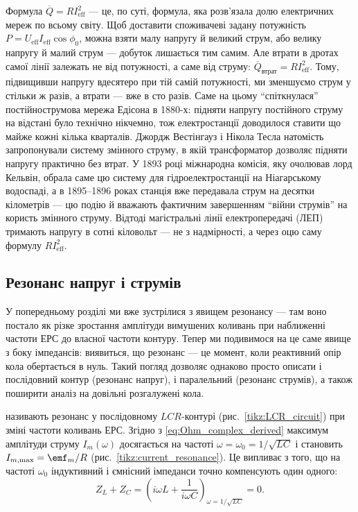 \begin{Historical}
	Формула $\overline{Q} = RI_{\text{eff}}^2$ --- це, по суті, формула, яка розв'язала долю електричних мереж по всьому світу. Щоб доставити споживачеві задану потужність $P = U_{\text{eff}}I_{\text{eff}}\cos\phi_0$, можна взяти малу напругу й великий струм, або велику напругу й малий струм --- добуток лишається тим самим. Але втрати в дротах самої лінії залежать не від потужності, а саме від струму: $\overline{Q}_{\text{втрат}} = RI_{\text{eff}}^2$. Тому, підвищивши напругу вдесятеро при тій самій потужності, ми зменшуємо струм у стільки ж разів, а втрати --- вже в сто разів. Саме на цьому \enquote{спіткнулася} постійнострумова мережа Едісона в 1880-х: підняти напругу постійного струму на відстані було технічно нікчемно, тож електростанції доводилося ставити що майже кожні кілька кварталів. Джордж Вестінгауз і Нікола Тесла натомість запропонували систему змінного струму, в якій трансформатор дозволяє підняти напругу практично без втрат. У 1893 році міжнародна комісія, яку очолював лорд Кельвін, обрала саме цю систему для гідроелектростанції на Ніагарському водоспаді, а в 1895--1896 роках станція вже передавала струм на десятки кілометрів --- цю подію й вважають фактичним завершенням \enquote{війни струмів} на користь змінного струму. Відтоді магістральні лінії електропередачі (ЛЕП) тримають напругу в сотні кіловольт --- не з надмірності, а через оцю саму формулу $RI_{\text{eff}}^2$.
\end{Historical}

\subsection*{Резонанс напруг і струмів}\label{sec:ac_resonance}

У попередньому розділі ми вже зустрілися з явищем резонансу --- там воно постало як різке зростання амплітуди вимушених коливань при наближенні частоти ЕРС до власної частоти контуру. Тепер ми подивимося на це саме явище з боку імпедансів: виявиться, що резонанс --- це момент, коли реактивний опір кола обертається в нуль. Такий погляд дозволяє однаково просто описати і послідовний контур (резонанс напруг), і паралельний (резонанс струмів), а також поширити аналіз на довільні розгалужені кола.


 називають резонанс у послідовному
$LCR$-кон\-ту\-рі (рис.~\ref{tikz:LCR_circuit}) при зміні частоти коливань ЕРС. Згідно з \eqref{eq:Ohm_complex_derived} максимум амплітуди струму $I_m(\omega)$ досягається на частоті $\omega = \omega_0 = 1/\sqrt{LC}$ і становить $I_{m,\max} = \emf_m/R$ (рис.~\ref{tikz:current_resonance}). Це випливає з того, що на частоті $\omega_0$ індуктивний і ємнісний імпеданси точно компенсують один одного:
\begin{equation}\label{eq:impedance_compensation_2}
	Z_L + Z_C = \left(i\omega L + \frac{1}{i\omega C}\right)_{\omega = 1/\sqrt{LC}} = 0.
\end{equation}

